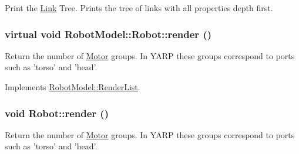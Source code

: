 Print the \hyperlink{class_robot_model_1_1_link}{Link} Tree. Prints the tree of links with all properties depth first. \hypertarget{class_robot_model_1_1_robot_a3be7d3c8d21aeb68633d9e176a3fbf08}{
\subsubsection[{render}]{\setlength{\rightskip}{0pt plus 5cm}virtual void RobotModel::Robot::render ()}}
\label{class_robot_model_1_1_robot_a3be7d3c8d21aeb68633d9e176a3fbf08}


Return the number of \hyperlink{class_robot_model_1_1_motor}{Motor} groups. In YARP these groups correspond to ports such as 'torso' and 'head'. 

Implements \hyperlink{class_robot_model_1_1_render_list_ac8646765beee22bf11582049dc3cf195}{RobotModel::RenderList}.\hypertarget{class_robot_model_1_1_robot_a47e480a4cad58266d12efce34f3fb563}{
\subsubsection[{render}]{\setlength{\rightskip}{0pt plus 5cm}void Robot::render ()}}
\label{class_robot_model_1_1_robot_a47e480a4cad58266d12efce34f3fb563}


Return the number of \hyperlink{class_robot_model_1_1_motor}{Motor} groups. In YARP these groups correspond to ports such as 'torso' and 'head'. 

